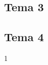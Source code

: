 \documentclass[11pt, A4paper, english]{report}
\begin{document}
\begin{multicols}{2}
			\subsection{Tema 3}


			\subsection{Tema 4}


		\begin{thebibliography}{9}
1
		\end{thebibliography}
	\end{multicols}
\end{document}
